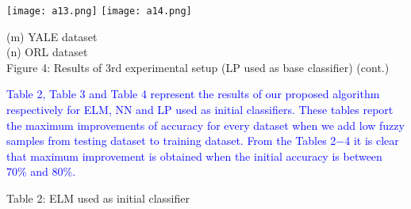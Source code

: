 \documentclass{article}
\begin{document}
		  
		  
		  \newpage
		  \texttt{[image: a13.png]}
		  \texttt{[image: a14.png]}
		  \begin{center}
		  	\small (m) YALE dataset\\
		  	\vspace{0.5em}(n) ORL dataset\\
		  	\vspace{0.9em}
		  	Figure 4: Results of 3rd experimental setup (LP used as base classifier) (cont.)\\\vspace{0.5em}
		  \end{center}
		  
		  \textcolor{blue}{Table 2, Table 3 and Table 4 represent the results of our proposed algorithm respectively for ELM, NN and LP used as initial classifiers. These tables report the maximum improvements of accuracy for every dataset when we add low fuzzy samples from testing dataset to training dataset. From the Tables 2$-$4 it is clear that maximum improvement is obtained when the initial accuracy is between 70\% and 80\%.}
		   \begin{center}
		  	\small Table 2: ELM used as initial classifier\\\vspace{0.5em}
		  \end{center}
		  
\end{document}
